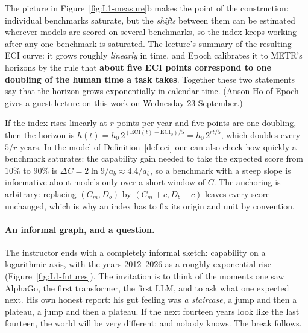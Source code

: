 The picture in Figure~\ref{fig:L1-measure}b makes the point of the construction: individual benchmarks saturate, but the \emph{shifts} between them can be estimated wherever models are scored on several benchmarks,
so the index keeps working after any one benchmark is saturated. The lecture's summary of the resulting ECI curve: it grows roughly \emph{linearly} in time, and Epoch calibrates it to METR's horizons by the rule that
\textbf{about five ECI points correspond to one doubling of the human time a task takes}. Together these two statements say that the horizon grows exponentially in calendar time. (Anson Ho of Epoch gives a guest lecture on this work on Wednesday 23 September.)

\begin{beyond}
If the index rises linearly at $r$ points per year and five points are one doubling, then the horizon is $h(t)=h_0\,2^{(\mathrm{ECI}(t)-\mathrm{ECI}_0)/5}=h_0\,2^{rt/5}$, which doubles every $5/r$ years. In the model of Definition~\ref{def:eci} one can also check how quickly a benchmark saturates:
the capability gain needed to take the expected score from $10\%$ to $90\%$ is $\Delta C=2\ln 9/a_b\approx 4.4/a_b$, so a benchmark with a steep slope is informative about models only over a short window of $C$.
The anchoring is arbitrary: replacing $(C_m,D_b)$ by $(C_m+c,D_b+c)$ leaves every score unchanged, which is why an index has to fix its origin and unit by convention.
\end{beyond}

\paragraph{An informal graph, and a question.}
The instructor ends with a completely informal sketch: capability on a logarithmic axis, with the years 2012--2026 as a roughly exponential rise (Figure~\ref{fig:L1-futures}).
The invitation is to think of the moments one saw AlphaGo, the first transformer, the first LLM, and to ask what one expected next. His own honest report: his gut feeling was \emph{a staircase}, a jump and then a plateau, a jump and then a plateau.
If the next fourteen years look like the last fourteen, the world will be very different; and nobody knows. The break follows.

